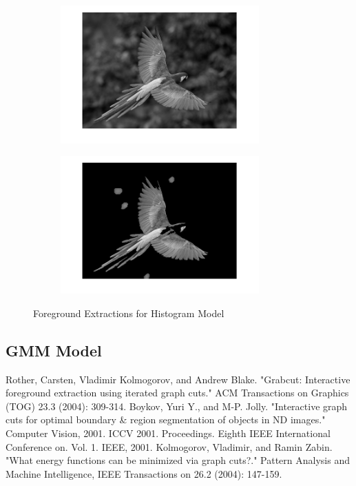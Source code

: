 \documentclass[a4paper]{article}
\begin{document}
\begin{figure}[h]
\begin{subfigure}{.5\textwidth}
  \centering
  \includegraphics[width = 3in]{parrot_input_h.png}
  \label{fig:sfig2}
\end{subfigure}
\begin{subfigure}{.5\textwidth}
  \centering
  \includegraphics[width = 3in]{parrot_output_h.png}
  \label{fig:sfig2}
\end{subfigure}

\caption{Foreground Extractions for Histogram Model}
\end{figure}

\subsection{GMM Model}


\begin{thebibliography}{10}

 Rother, Carsten, Vladimir Kolmogorov, and Andrew Blake. "Grabcut: Interactive foreground extraction using iterated graph cuts." ACM Transactions on Graphics (TOG) 23.3 (2004): 309-314.
 Boykov, Yuri Y., and M-P. Jolly. "Interactive graph cuts for optimal boundary \& region segmentation of objects in ND images." Computer Vision, 2001. ICCV 2001. Proceedings. Eighth IEEE International Conference on. Vol. 1. IEEE, 2001.
 Kolmogorov, Vladimir, and Ramin Zabin. "What energy functions can be minimized via graph cuts?." Pattern Analysis and Machine Intelligence, IEEE Transactions on 26.2 (2004): 147-159.
\end{thebibliography}
\end{document}
